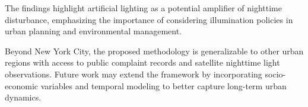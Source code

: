 \documentclass[conference]{IEEEtran}
\begin{document}
The findings highlight artificial lighting as a potential amplifier of nighttime
disturbance, emphasizing the importance of considering illumination policies in
urban planning and environmental management.

Beyond New York City, the proposed methodology is generalizable to other
urban regions with access to public complaint records and satellite
nighttime light observations.
Future work may extend the framework by incorporating socio-economic
variables and temporal modeling to better capture long-term urban dynamics.


\nocite{*}



\end{document}
